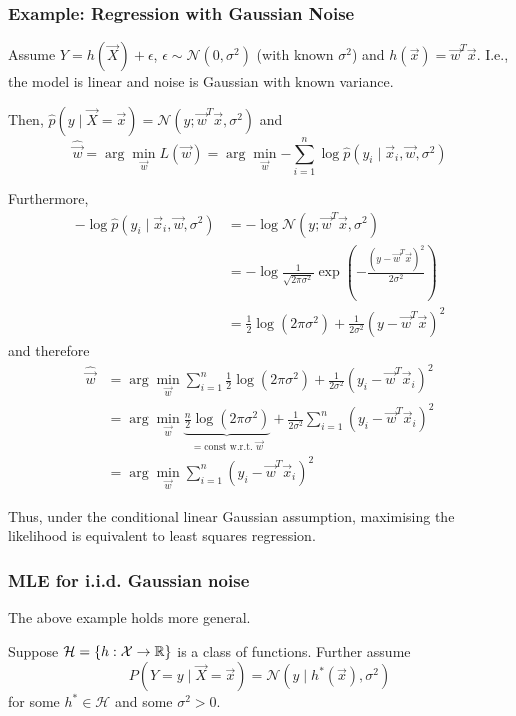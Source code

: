 \subsubsection{Example: Regression with Gaussian Noise}
Assume $Y = h(\vec{X}) + \epsilon$,
$\epsilon \sim \mathcal{N}(0, \sigma^2)$ 
(with known $\sigma^2$) and
$h(\vec{x}) = \vec{w}^T \vec{x}$.
I.e., the model is linear and noise is Gaussian
with known variance.

Then,
$\hat{p}(y \mid \vec{X} = \vec{x}) = \mathcal{N}(y; \vec{w}^T \vec{x}, \sigma^2)$
and
\begin{equation*}
    \hat{\vec{w}} = \arg\min_{\vec{w}}{L(\vec{w})}
    = \arg\min_{\vec{w}}{
        -\sum_{i=1}^n{\log{\hat{p}(y_i \mid \vec{x}_i, \vec{w}, \sigma^2)}}
    }
\end{equation*}

Furthermore,
\begin{align*}
    - \log{\hat{p}(y_i \mid \vec{x}_i, \vec{w}, \sigma^2)}
    &= -\log{\mathcal{N}(y; \vec{w}^T \vec{x}, \sigma^2)} \\
    &= -\log{\frac{1}{\sqrt{2 \pi \sigma^2}} \exp{
        \left( -\frac{(y - \vec{w}^T \vec{x})^2}{2 \sigma^2} \right)
    }} \\
    &= \frac{1}{2} \log{(2 \pi \sigma^2)} + \frac{1}{2 \sigma^2} (y-\vec{w}^T \vec{x})^2
\end{align*}
and therefore
\begin{align*}
    \hat{\vec{w}} &= \arg\min_{\vec{w}}{
        \sum_{i=1}^n{\frac{1}{2} \log{(2 \pi \sigma^2)} + \frac{1}{2 \sigma^2} (y_i-\vec{w}^T \vec{x}_i)^2}
    } \\
    &= \arg\min_{\vec{w}}{
        \underbrace{\frac{n}{2} \log{(2 \pi \sigma^2)}}_{= \text{const w.r.t. $\vec{w}$}}
        + \frac{1}{2 \sigma^2} \sum_{i=1}^n{(y_i - \vec{w}^T \vec{x}_i)^2}
    } \\
    &= \arg\min_{\vec{w}}{\sum_{i=1}^n{(y_i - \vec{w}^T \vec{x}_i)^2}}
\end{align*}

Thus, under the conditional linear Gaussian assumption,
maximising the likelihood is equivalent
to least squares regression.


\subsubsection{MLE for i.i.d. Gaussian noise}
The above example holds more general.

Suppose $\mathcal{H} = \{h : \mathcal{X} \to \mathbb{R}\}$
is a class of functions.
Further assume
\begin{equation*}
    P(Y = y \mid \vec{X} = \vec{x}) =
    \mathcal{N}(y \mid h^*(\vec{x}), \sigma^2)
\end{equation*}
for some $h^* \in \mathcal{H}$ and some $\sigma^2 > 0$.

